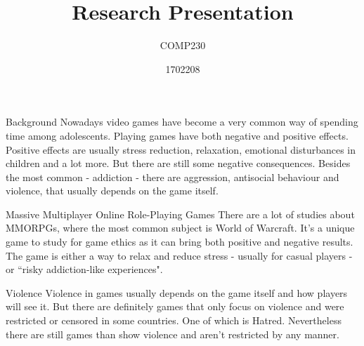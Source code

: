 \documentclass{beamer}
\title{Research Presentation}
\subtitle{COMP230}
\author{1702208}
\begin{document}
\begin{frame}
	\maketitle
\end{frame}

\begin{frame}{Background}
	Nowadays video games have become a very common way of spending time among adolescents. Playing games have both negative and positive effects. Positive effects are usually stress reduction\cite{russoniello2009effectiveness}, relaxation\cite{wack2009relationships}, emotional disturbances in children\cite{jones2014gaming}\cite{hull2009computer} and a lot more. But there are still some negative consequences. Besides the most common - addiction - there are aggression, antisocial behaviour and violence, that usually depends on the game itself.
\end{frame}

\begin{frame}{Massive Multiplayer Online Role-Playing Games}
	There are a lot of studies about MMORPGs, where the most common subject is World of Warcraft. It's a unique game to study for game ethics as it can bring both positive and negative results. The game is either a way to relax and reduce stress - usually for casual players - or ``risky addiction-like experiences"\cite{snodgrass2011magical}. 
\end{frame}

\begin{frame}{Violence}
	Violence in games usually depends on the game itself and how players will see it. But there are definitely games that only focus on violence and were restricted or censored in some countries. One of which is Hatred. Nevertheless there are still games than show violence and aren't restricted by any manner.
\end{frame}
\end{document}
